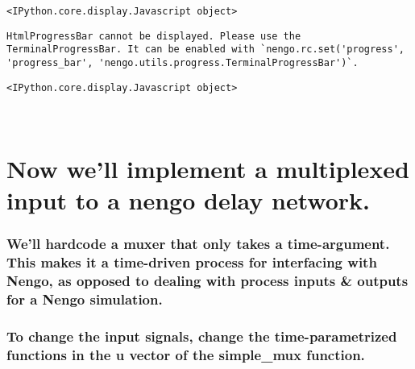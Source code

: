 \documentclass[11pt]{article}
\begin{document}
    
    
    \begin{verbatim}
<IPython.core.display.Javascript object>
    \end{verbatim}

    
    
    \begin{verbatim}
HtmlProgressBar cannot be displayed. Please use the TerminalProgressBar. It can be enabled with `nengo.rc.set('progress', 'progress_bar', 'nengo.utils.progress.TerminalProgressBar')`.
    \end{verbatim}

    
    
    \begin{verbatim}
<IPython.core.display.Javascript object>
    \end{verbatim}

    
    \begin{center}
    \end{center}
    { \hspace*{\fill} \\}
    
    \section{Now we'll implement a multiplexed input to a nengo delay
network.}\label{now-well-implement-a-multiplexed-input-to-a-nengo-delay-network.}

\subsubsection{We'll hardcode a muxer that only takes a time-argument.
This makes it a time-driven process for interfacing with Nengo, as
opposed to dealing with process inputs \& outputs for a Nengo
simulation.}\label{well-hardcode-a-muxer-that-only-takes-a-time-argument.-this-makes-it-a-time-driven-process-for-interfacing-with-nengo-as-opposed-to-dealing-with-process-inputs-outputs-for-a-nengo-simulation.}

\subsubsection{To change the input signals, change the time-parametrized
functions in the u vector of the simple\_mux
function.}\label{to-change-the-input-signals-change-the-time-parametrized-functions-in-the-u-vector-of-the-simple_mux-function.}
\end{document}

